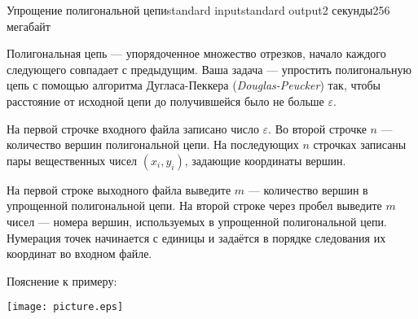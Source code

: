 \begin{problem}{Упрощение полигональной цепи}{standard input}{standard output}{2 секунды}{256 мегабайт}

Полигональная цепь — упорядоченное множество отрезков, начало каждого следующего совпадает с предыдущим.
Ваша задача — упростить полигональную цепь с помощью алгоритма Дугласа-Пеккера (\emph{Douglas-Peucker}) так,
чтобы расстояние от исходной цепи до получившейся было не больше $\varepsilon$.


\InputFile

На первой строчке входного файла записано число $\varepsilon$.
Во второй строчке $n$ — количество вершин полигональной цепи.
На последующих $n$ строчках записаны пары вещественных чисел $(x_i, y_i)$, задающие координаты вершин.

\OutputFile

На первой строке выходного файла выведите $m$ — количество вершин в упрощенной полигональной цепи.
На второй строке через пробел выведите $m$ чисел — номера вершин, используемых в упрощенной полигональной цепи.
Нумерация точек начинается с единицы и задаётся в порядке следования их координат во входном файле.

\Examples

\begin{example}%
%
\end{example}

Пояснение к примеру:
	\begin{center}
		\texttt{[image: picture.eps]}
	\end{center}
\end{problem}
